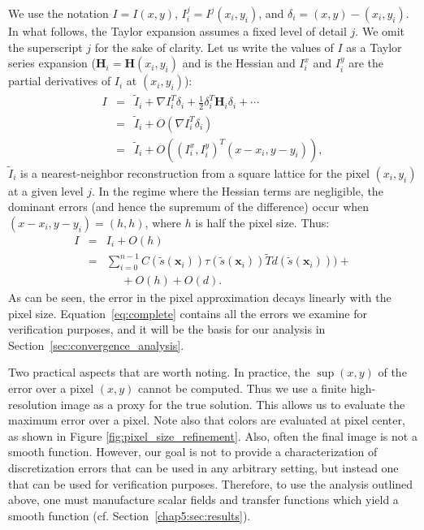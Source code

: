 We use the notation $I = I(x,y)$, $I^j_i = I^j(x_i, y_i)$, and $\delta_i =
(x, y) - (x_i, y_i)$. In what follows, the Taylor expansion assumes a fixed level of detail $j$. 
We omit the superscript $j$ for the sake of clarity. Let us write
 the values of $I$ as a Taylor series expansion ($\mathbf{H}_i = 
 \mathbf{H}(x_i, y_i)$ and is the Hessian and $I_i^x$ and $I_i^y$ 
 are the partial derivatives of $I_i$ at $(x_i, y_i)$):
\begin{eqnarray}
I &=& \tilde{I}_i + \nabla I_i^T \delta_i + \frac{1}{2}\delta_i^T \mathbf{H}_i
\delta_i + \cdots \\
  &=& \tilde{I}_i + O(\nabla I_i^T \delta_i)\\
  &=& \tilde{I}_i + O( (I_i^x, I_i^y)^T (x - x_i, y - y_i)),
\end{eqnarray}
$\tilde{I}_i$ is a nearest-neighbor reconstruction from a square
lattice for the pixel $(x_i, y_i)$ at a given level $j$. In the regime where the Hessian terms are negligible, the
dominant errors (and hence the supremum of the difference) occur 
when $(x - x_i, y - y_i) = (h, h)$, where $h$ is half the pixel size.
Thus: 
\begin{eqnarray}
I &=& I_i + O(h)\\
&=& \sum_{i = 0} ^ {n - 1} C (\tilde{s}(\mathbf{x}_i))\tau(
\tilde{s}( \mathbf{x}_i)) \tilde{T}d(\tilde{s}(\mathbf{x}_i))) +\nonumber\\
&& ~~~~~~ + O(h) + O(d). \label{eq:complete}
\end{eqnarray}
As can be seen, the error in the pixel approximation decays linearly with the pixel
size. Equation~\eqref{eq:complete} contains all the errors we examine for
verification purposes, and it will be the basis for our analysis in
Section~\ref{sec:convergence_analysis}.

Two practical aspects that are worth noting. 
In practice, the $\sup(x,y)$ of the error over a pixel $(x,y)$ cannot be computed. 
Thus we use a finite high-resolution 
image as a proxy for the true solution. This allows us to 
evaluate the maximum error over a pixel. Note also that colors are evaluated at pixel
center, as shown in Figure \ref{fig:pixel_size_refinement}.
%
Also, often the final image is not
a smooth function. However, our goal is not to provide a
characterization of discretization errors that can be used in any arbitrary
setting, but instead one that can be used for
verification purposes. Therefore, 
to use the analysis outlined above,
one must manufacture scalar fields and transfer functions which yield a smooth function (cf. Section~\ref{chap5:sec:results}).

